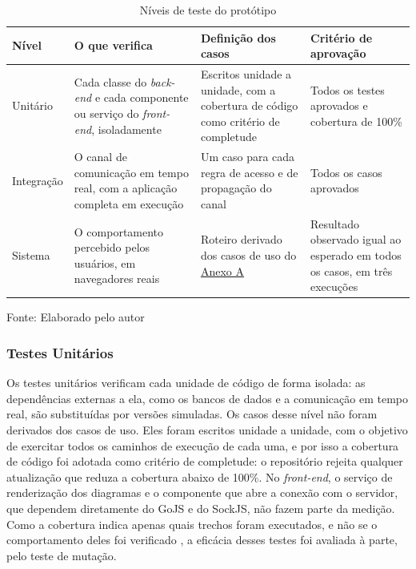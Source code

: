 \begin{table}[H]
\centering
\renewcommand{\arraystretch}{1.4}
\caption{Níveis de teste do protótipo}
\label{tab:niveis-teste}
    \begin{tabulary}{\textwidth}{|l|L|L|L|}
    \hline
    \textbf{Nível} & \textbf{O que verifica} & \textbf{Definição dos casos} & \textbf{Critério de aprovação} \\
    \hline
    Unitário & Cada classe do \textit{back-end} e cada componente ou serviço do \textit{front-end}, isoladamente & Escritos unidade a unidade, com a cobertura de código como critério de completude & Todos os testes aprovados e cobertura de 100\% \\
    \hline
    Integração & O canal de comunicação em tempo real, com a aplicação completa em execução & Um caso para cada regra de acesso e de propagação do canal & Todos os casos aprovados \\
    \hline
    Sistema & O comportamento percebido pelos usuários, em navegadores reais & Roteiro derivado dos casos de uso do \hyperref[anx:caso-de-uso]{Anexo A} & Resultado observado igual ao esperado em todos os casos, em três execuções \\
    \hline
    \end{tabulary}
\begin{center}
    {\small Fonte: Elaborado pelo autor}
\end{center}
\end{table}

\subsubsection{Testes Unitários}
Os testes unitários verificam cada unidade de código de forma isolada: as dependências externas a ela, como os bancos de dados e a comunicação em tempo real, são substituídas por versões simuladas. Os casos desse nível não foram derivados dos casos de uso. Eles foram escritos unidade a unidade, com o objetivo de exercitar todos os caminhos de execução de cada uma, e por isso a cobertura de código foi adotada como critério de completude: o repositório rejeita qualquer atualização que reduza a cobertura abaixo de 100\%. No \textit{front-end}, o serviço de renderização dos diagramas e o componente que abre a conexão com o servidor, que dependem diretamente do GoJS e do SockJS, não fazem parte da medição. Como a cobertura indica apenas quais trechos foram executados, e não se o comportamento deles foi verificado \cite{Inozemtseva2014}, a eficácia desses testes foi avaliada à parte, pelo teste de mutação.

